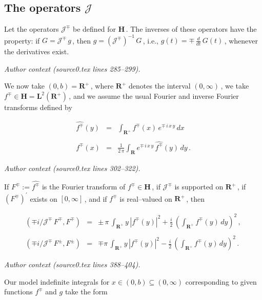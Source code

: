\documentclass[10pt,a4paper]{amsart}
\begin{document}
\subsection{The operators ${\mathcal J}$}

Let the operators ${\mathcal J}^\mp$ be defined for ${\mathbf H}$\,.
The inverses of these operators have the property: if $G = {\mathcal
  J}^\mp\,g$\,, then $g = \left({\mathcal J}^\mp\right)^{-1}\,G$\,,
i.e., $g(t) = \mp \, \frac{d}{dt}\,G(t)$\,, whenever the derivatives
exist.
\par\medskip\noindent\textit{Author context (source0.tex lines 285--299).}\par\smallskip
 \vspace{.2in} \noindent We now take $(0,b) = {\mathbf R}^+$\,, where
 ${\mathbf R}^+$ denotes the interval $(0,\infty)$\,, we take $f^\mp
 \in {\mathbf H} = {\mathbf L}^2({\mathbf R}^+)$\,, and we assume the
 usual Fourier and inverse Fourier transforms defined by 

 \begin{equation}%
   \begin{array}{rcl}
     \widehat{f^\mp}(y) & = & \displaystyle \int_{{\mathbf R}^+} f^\mp(x) \,
     e^{\mp\,i\,x\,y} \, dx \\
     && \\
 f^\mp(x) & = & \displaystyle \frac{1}{2\,\pi} \int_{\mathbf R}
 e^{\mp\,i\,x\,y} \, \widehat{f^\mp}(y) \, dy\,.
   \end{array}
   \label{equation:2.5}
 \end{equation}
\par\medskip\noindent\textit{Author context (source0.tex lines 302--322).}\par\smallskip
\begin{Theorem}%
  \label{Theorem:2.4}
  If $F^\mp := \widehat{f^\mp}$ is the Fourier transform of $f^\mp \in
  {\mathbf H}$\,, if ${\mathcal J}^\mp$ is supported on ${\mathbf
    R}^+$\,, if $(F^\mp)^\prime$ exists on $[0,\infty]$\,, and if
  $f^\mp$ is real--valued on ${\mathbf R}^+$\,, then
  
  \begin{equation}%
    \begin{array}{rcl}
    (\mp i/{\mathcal J}^\mp\,F^\mp,F^\mp) & = & \pm \,  \displaystyle \pi \,
      \int_{{\mathbf R}^+}y\,|f^\mp(y)|^2 + \frac{i}{2} \,
      \left(\int_{{\mathbf R}^+} f^\mp(y) \, dy\right)^2\,, \\
    && \\
    (\mp i/{\mathcal J}^\mp\,F^\pm,F^\pm) & = & \mp \displaystyle \pi \,
      \int_{{\mathbf R}^+}y\,|f^\mp(y)|^2 - \frac{i}{2} \,
      \left(\int_{{\mathbf R}^+} f^\mp(y) \, dy\right)^2\,.
      \end{array}
    \label{equation:2.6}
  \end{equation}

  \end{Theorem}
\par\medskip\noindent\textit{Author context (source0.tex lines 388--404).}\par\smallskip
Our model indefinite integrals for $x \in (0,b) \subseteq
(0,\infty)$ corresponding to given functions $f^\mp$ and $g$ take the
form
\end{document}
